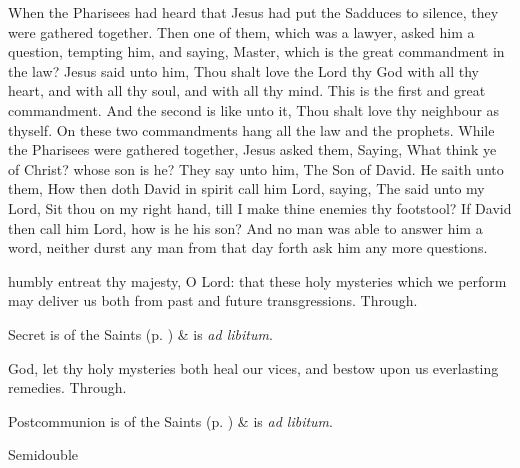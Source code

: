  When the Pharisees had heard that Jesus had put the Sadduces to silence, they were gathered together. Then one of them, which was a lawyer, asked him a question, tempting him, and saying, Master, which is the great commandment in the law? Jesus said unto him, Thou shalt love the Lord thy God with all thy heart, and with all thy soul, and with all thy mind. This is the first and great commandment. And the second is like unto it, Thou shalt love thy neighbour as thyself. On these two commandments hang all the law and the prophets. While the Pharisees were gathered together, Jesus asked them, Saying, What think ye of Christ? whose son is he? They say unto him, The Son of David. He saith unto them, How then doth David in spirit call him Lord, saying, The  said unto my Lord, Sit thou on my right hand, till I make thine enemies thy footstool? If David then call him Lord, how is he his son? And no man was able to answer him a word, neither durst any man from that day forth ask him any more questions.


\secret
{} humbly entreat thy majesty, O Lord: that these holy mysteries which we perform may deliver us both from past and future transgressions. Through.
\begin{rubric}
     Secret is of the Saints (p. \pageref{SPSaints}) \&  is \emph{ad libitum}.
\end{rubric}


\postcommunion
{} God, let thy holy mysteries both heal our vices, and bestow upon us everlasting remedies. Through.
\begin{rubric}
     Postcommunion is of the Saints (p. \pageref{SPSaints}) \&  is \emph{ad libitum}.
\end{rubric}

\begin{inhead}
{Semidouble}
\end{inhead}
\par\noindent
{}

